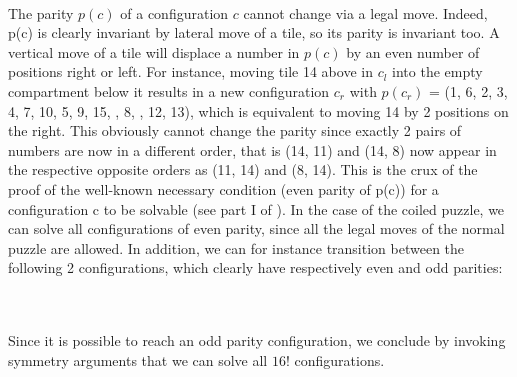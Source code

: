 \begin{fifteen}
\end{fifteen}
% 
\begin{fifteen}
\end{fifteen}
\\
The parity $p(c)$ of a configuration $c$ cannot change via a legal move. Indeed, p(c) is clearly invariant by lateral move of a tile, so its parity is invariant too. A vertical move of a tile will displace a number in $p(c)$ by an even number of positions right or left. For instance, moving tile 14 above in $c_{l}$  into the empty compartment below it results in a new configuration $c_{r}$ with $p(c_{r})$ = (1, 6, 2, 3, 4, 7, 10, 5, 9, 15, , 8\black, \black, 12, 13), which is equivalent to moving 14 by 2 positions on the right. This obviously cannot change the parity since exactly 2 pairs of numbers are now in a different order, that is (14, 11) and (14, 8) now appear in the respective opposite orders as (11, 14) and (8, 14). This is the crux of the proof of the well-known necessary condition (even parity of p(c)) for a configuration c to be solvable (see part I of \cite{Johnson1879}). In the case of the coiled puzzle, we can solve all configurations of even parity, since all the legal moves of the normal puzzle are allowed. In addition, we can for instance transition between the following 2 configurations, which clearly have respectively even and odd parities:

\begin{fifteen}
\centering
{}
\end{fifteen}
%
\begin{fifteen}
\end{fifteen}
\\
\\
Since it is possible to reach an odd parity configuration, we conclude by invoking symmetry arguments that we can solve all $16!$ configurations. 


\label{Theory:SPSSS}

